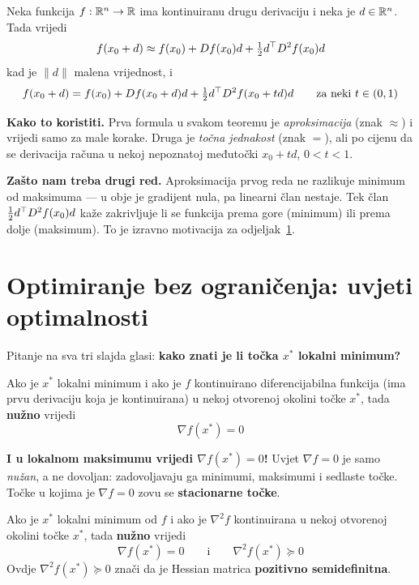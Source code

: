 \begin{teorem}
Neka funkcija $f : \mathbb{R}^n \to \mathbb{R}$ ima kontinuiranu drugu derivaciju i neka je
$d \in \mathbb{R}^n$. Tada vrijedi
\[
f(x_0 + d) \approx f(x_0) + Df(x_0)d + \tfrac{1}{2}d^{\top} D^2f(x_0)d
\]
kad je $\|d\|$ malena vrijednost, i
\[
f(x_0 + d) = f(x_0) + Df(x_0 + d)d + \tfrac{1}{2}d^{\top} D^2f(x_0 + td)d
\qquad \text{za neki } t \in (0,1)
\]
\end{teorem}

\textbf{Kako to koristiti.} Prva formula u svakom teoremu je
\emph{aproksimacija} (znak $\approx$) i vrijedi samo za male korake. Druga je
\emph{točna jednakost} (znak $=$), ali po cijenu da se derivacija računa u
nekoj nepoznatoj međutočki $x_0 + td$, $0 < t < 1$.

\textbf{Zašto nam treba drugi red.} Aproksimacija prvog reda ne razlikuje
minimum od maksimuma --- u obje je gradijent nula, pa linearni član nestaje.
Tek član $\tfrac{1}{2}d^{\top} D^2f(x_0)d$ kaže zakrivljuje li se funkcija prema gore
(minimum) ili prema dolje (maksimum). To je izravno motivacija za
odjeljak~\ref{sec:uvjeti-bez-ogr}.

\section{Optimiranje bez ograničenja: uvjeti optimalnosti}
\label{sec:uvjeti-bez-ogr}

Pitanje na sva tri slajda glasi: \textbf{kako znati je li točka $x^{*}$ lokalni
minimum?}

\begin{teorem}
Ako je $x^{*}$ lokalni minimum i ako je $f$ kontinuirano diferencijabilna
funkcija (ima prvu derivaciju koja je kontinuirana) u nekoj otvorenoj okolini
točke $x^{*}$, tada \textbf{nužno} vrijedi
\[
\nabla f(x^{*}) = 0
\]
\end{teorem}

\begin{napomena}
\textbf{I u lokalnom maksimumu vrijedi $\nabla f(x^{*}) = 0$!} Uvjet
$\nabla f = 0$ je samo \emph{nužan}, a ne dovoljan: zadovoljavaju ga minimumi,
maksimumi i sedlaste točke. Točke u kojima je $\nabla f = 0$ zovu se
\textbf{stacionarne točke}.
\end{napomena}

\begin{teorem}
Ako je $x^{*}$ lokalni minimum od $f$ i ako je $\nabla^2 f$ kontinuirana u nekoj
otvorenoj okolini točke $x^{*}$, tada \textbf{nužno} vrijedi
\[
\nabla f(x^{*}) = 0 \qquad\text{i}\qquad \nabla^2 f(x^{*}) \succeq 0
\]
Ovdje $\nabla^2f(x^{*}) \succeq 0$ znači da je Hessian matrica \textbf{pozitivno
semidefinitna}.
\end{teorem}

